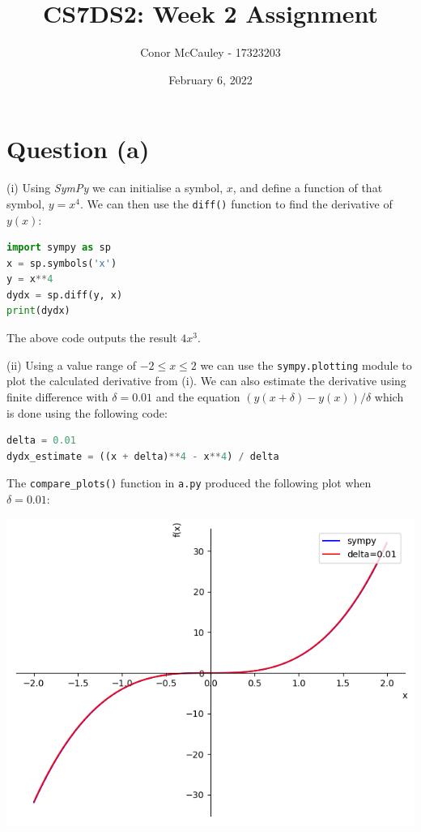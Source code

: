 \documentclass[12pt]{article}
\title{CS7DS2: Week 2 Assignment}
\author{Conor McCauley - 17323203}
\date{February 6, 2022}
\begin{document}
\maketitle

\section*{Question (a)}

\noindent (i) Using \textit{SymPy} we can initialise a symbol, $x$, and define a function of that symbol, $y = x^4$. We can then use the \texttt{diff()} function to find the derivative of $y(x)$:

\lstset{basicstyle=\footnotesize,xleftmargin=.35in}
\begin{lstlisting}[language=Python]
import sympy as sp
x = sp.symbols('x')
y = x**4
dydx = sp.diff(y, x)
print(dydx)
\end{lstlisting}

The above code outputs the result $4x^3$.

\noindent (ii) Using a value range of $-2 \leq x \leq 2$ we can use the \texttt{sympy.plotting} module to plot the calculated derivative from (i). We can also estimate the derivative using finite difference with $\delta=0.01$ and the equation $(y(x + \delta) - y(x)) / \delta$ which is done using the following code:

\lstset{basicstyle=\footnotesize,xleftmargin=.35in}
\begin{lstlisting}[language=Python]
delta = 0.01
dydx_estimate = ((x + delta)**4 - x**4) / delta
\end{lstlisting}

The \texttt{compare\_plots()} function in \texttt{a.py} produced the following plot when $\delta=0.01$:

\begin{center}
    \includegraphics[scale=0.55]{figs/a/a_ii.png}
\end{center}
\end{document}
